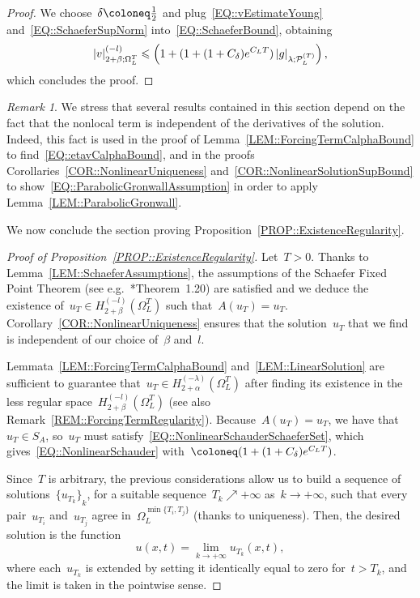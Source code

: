 \documentclass[12pt,a4paper]{amsart}
\makeatletter
\numberwithin{equation}{section}
\theoremstyle{definition}
\theoremstyle{remark}
\newtheorem{remark}[theorem]{Remark}
\newcommand{\abs}[1]{\left\lvert#1\right\rvert}
\renewcommand{\leq}{\leqslant}
\newcommand{\const}[1]{%
  \csname const@#1\endcsname%
}
\makeatother
\begin{document}
\begin{proof}
    We choose~$\delta \coloneq \frac{1}{2\const{CONST::LinearSchauder}}$ and plug~\eqref{EQ::vEstimateYoung} and~\eqref{EQ::SchaeferSupNorm} into~\eqref{EQ::SchaeferBound}, obtaining
    \begin{equation}\label{EQ::NonlinearSchauderSchaeferSet}
        \abs{v}_{2+\beta; \Omega_L^T}^{(-l)} \leq \const{CONST::LinearSchauder}\left(1 + (1+(1+C_\delta)e^{C_L T})\abs{g}_{\lambda; \mathcal{P}_L^{(T)}}\right),
    \end{equation}
    which concludes the proof.
\end{proof}

\begin{remark}\label{REM::NonlocalitySemilinearForRegularity}
    We stress that several results contained in this section depend on the fact that the nonlocal term is independent of the derivatives of the solution. Indeed, this fact is used in the proof of Lemma~\ref{LEM::ForcingTermCalphaBound} to find~\eqref{EQ::etavCalphaBound}, and in the proofs Corollaries~\ref{COR::NonlinearUniqueness} and~\ref{COR::NonlinearSolutionSupBound} to show~\eqref{EQ::ParabolicGronwallAssumption} in order to apply Lemma~\ref{LEM::ParabolicGronwall}.
\end{remark}

We now conclude the section proving Proposition~\ref{PROP::ExistenceRegularity}.

\begin{proof}[Proof of Proposition~\ref{PROP::ExistenceRegularity}]
    Let~$T>0$. Thanks to Lemma~\ref{LEM::SchaeferAssumptions}, the assumptions of the Schaefer Fixed Point Theorem (see e.g.~\cite{MR3967045}*{Theorem~1.20}) are satisfied and we deduce the existence of~$u_T \in H_{2+\beta}^{(-l)}(\Omega_L^T)$ such that~$A(u_T) = u_T$. Corollary~\ref{COR::NonlinearUniqueness} ensures that the solution~$u_T$ that we find is independent of our choice of~$\beta$ and~$l$.
    
    Lemmata~\ref{LEM::ForcingTermCalphaBound} and~\ref{LEM::LinearSolution} are sufficient to guarantee that~$u_T \in H_{2+\alpha}^{(-\lambda)}(\Omega_L^T)$ after finding its existence in the less regular space~$H_{2+\beta}^{(-l)}(\Omega_L^T)$ (see also Remark~\ref{REM::ForcingTermRegularity}). Because~$A(u_T) = u_T$, we have that~$u_T \in S_A$, so~$u_T$ must satisfy~\eqref{EQ::NonlinearSchauderSchaeferSet}, which gives~\eqref{EQ::NonlinearSchauder} with~$\const{CONST::ExistenceRegularity} \coloneq \const{CONST::LinearSchauder} (1+(1+C_\delta)e^{C_L T})$.

    Since~$T$ is arbitrary, the previous considerations allow us to build a sequence of solutions~${\{u_{T_k}\}}_k$, for a suitable sequence~$T_k \nearrow +\infty$ as~$k \to +\infty$, such that every pair~$u_{T_i}$ and~$u_{T_j}$ agree in~$\Omega_L^{\min\{T_i, T_j\}}$ (thanks to uniqueness). Then, the desired solution is the function
    \[u(x,t) = \lim_{k\to +\infty} u_{T_k}(x,t),\] %
    where each~$u_{T_k}$ is extended by setting it identically equal to zero for~$t > T_k$, and the limit is taken in the pointwise sense.
\end{proof}
\end{document}
